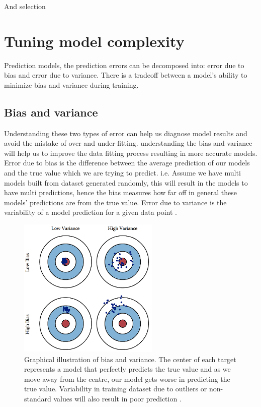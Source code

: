 And selection 

\section{Tuning model complexity}
\label{comp}
Prediction models, the prediction errors can be decomposed into: error due to bias and error due to variance. There is a tradeoff between a model's ability to minimize bias and variance during training. 
\subsection{Bias and variance }
Understanding these two types of error can help us diagnose model results and avoid the mistake of over and under-fitting. understanding the bias and variance will help us to improve the data fitting process resulting in more accurate models.
Error due to bias is the difference between the average prediction of our models and the true value which we are trying to predict. i.e. Assume we have multi models built from dataset generated randomly, this will result in the models to have multi predictions, hence the bias measures how far off in general these models' predictions are from the true value. Error due to variance is the variability of a model prediction for a given data point \citep{fortmann2012understanding}. 

\begin{figure}[H]
  \centering
    \includegraphics[width=0.6\textwidth]{images/Bias.png}
    \caption{Graphical illustration of bias and variance. The center of each target represents a model that perfectly predicts the true value and as we move away from the centre, our model gets worse in predicting the true value. Variability in training dataset due to outliers or non-standard values will also result in poor prediction \citep{fortmann2012understanding}.}
  \label{RC}
 \end{figure}
 
